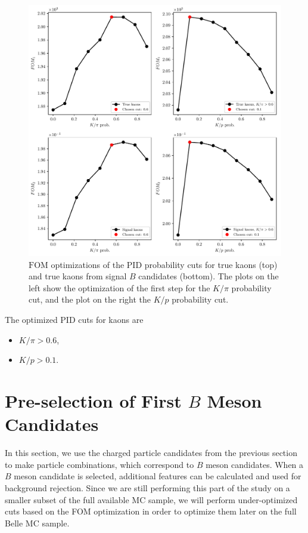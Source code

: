 \begin{figure}[H]
	\centering
	\captionsetup{width=.8\linewidth}
	\includegraphics[width=\linewidth]{fig/FSP_kaon_fom}
	\caption{$\mathrm{FOM}$ optimizations of the PID probability cuts for true kaons (top) and true kaons from signal $B$ candidates (bottom). The plots on the left show the optimization of the first step for the $K / \pi$ probability cut, and the plot on the right the $K/p$ probability cut.}
	\label{fig:Kfom}
\end{figure}

The optimized PID cuts for kaons are
\begin{itemize}
	\item $K/\pi > 0.6$,
	\item $K/p > 0.1$.
\end{itemize}

\section{Pre-selection of First \texorpdfstring{$B$}{B} Meson Candidates}

In this section, we use the charged particle candidates from the previous section to make particle combinations, which correspond to $B$ meson candidates. When a $B$ meson candidate is selected, additional features can be calculated and used for background rejection. Since we are still performing this part of the study on a smaller subset of the full available MC sample, we will perform under-optimized cuts based on the FOM optimization in order to optimize them later on the full Belle MC sample.

